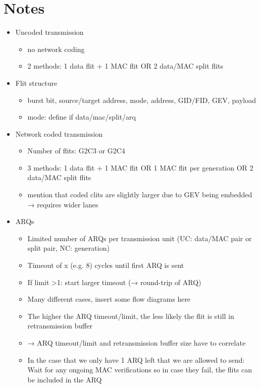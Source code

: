 \section{Notes}
\begin{itemize}
    \item Uncoded transmission
        \begin{itemize}
            \item no network coding
            \item 2 methods: 1 data flit + 1 MAC flit OR 2 data/MAC split flits
        \end{itemize}
    \item Flit structure
        \begin{itemize}
            \item burst bit, source/target address, mode, address, GID/FID, GEV, payload
            \item mode: define if data/mac/split/arq
        \end{itemize}
    \item Network coded transmission
        \begin{itemize}
            \item Number of flits: G2C3 or G2C4
            \item 3 methods: 1 data flit + 1 MAC flit OR 1 MAC flit per generation OR 2 data/MAC split flits
            \item mention that coded clits are slightly larger due to GEV being embedded → requires wider lanes
        \end{itemize}
    \item ARQs
        \begin{itemize}
            \item Limited number of ARQs per transmission unit (UC: data/MAC pair or split pair, NC: generation)
            \item Timeout of x (e.g. 8) cycles until first ARQ is sent
            \item If limit >1: start larger timeout (→ round-trip of ARQ)
            \item Many different cases, insert some flow diagrams here
            \item The higher the ARQ timeout/limit, the less likely the flit is still in retransmission buffer
            \item → ARQ timeout/limit and retransmission buffer size have to correlate
            \item In the case that we only have 1 ARQ left that we are allowed to send: Wait for any ongoing MAC verifications
                so in case they fail, the flits can be included in the ARQ
        \end{itemize}
\end{itemize}
\fi
